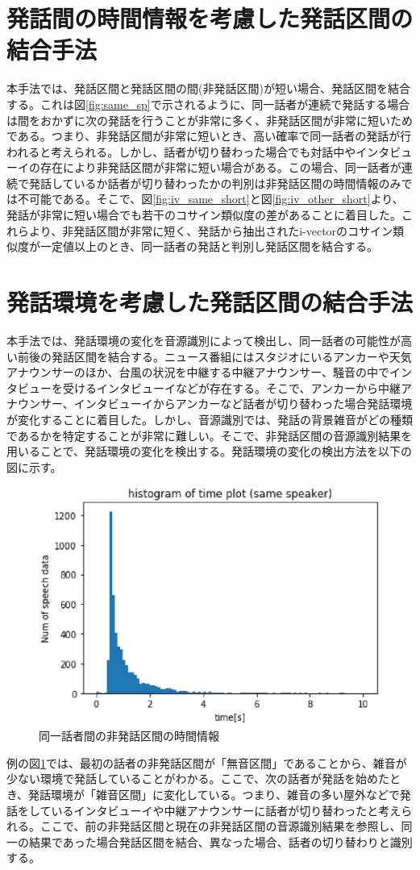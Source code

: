 \section{発話間の時間情報を考慮した発話区間の結合手法}
本手法では、発話区間と発話区間の間(非発話区間)が短い場合、発話区間を結合する。これは図\ref{fig:same_sp}で示されるように、同一話者が連続で発話する場合は間をおかずに次の発話を行うことが非常に多く、非発話区間が非常に短いためである。つまり、非発話区間が非常に短いとき、高い確率で同一話者の発話が行われると考えられる。しかし、話者が切り替わった場合でも対話中やインタビューイの存在により非発話区間が非常に短い場合がある。この場合、同一話者が連続で発話しているか話者が切り替わったかの判別は非発話区間の時間情報のみでは不可能である。そこで、図\ref{fig:iv_same_short}と図\ref{fig:iv_other_short}より、発話が非常に短い場合でも若干のコサイン類似度の差があることに着目した。これらより、非発話区間が非常に短く、発話から抽出されたi-vectorのコサイン類似度が一定値以上のとき、同一話者の発話と判別し発話区間を結合する。

\section{発話環境を考慮した発話区間の結合手法}
本手法では、発話環境の変化を音源識別によって検出し、同一話者の可能性が高い前後の発話区間を結合する。ニュース番組にはスタジオにいるアンカーや天気アナウンサーのほか、台風の状況を中継する中継アナウンサー、騒音の中でインタビューを受けるインタビューイなどが存在する。そこで、アンカーから中継アナウンサー、インタビューイからアンカーなど話者が切り替わった場合発話環境が変化することに着目した。しかし、音源識別では、発話の背景雑音がどの種類であるかを特定することが非常に難しい。そこで、非発話区間の音源識別結果を用いることで、発話環境の変化を検出する。発話環境の変化の検出方法を以下の図に示す。\par

\begin{figure}[H]
  \begin{center}
    \includegraphics{./figure/same_sp.eps}
  \end{center}
  \caption{同一話者間の非発話区間の時間情報 \label{fig:flow_prob2}}
\end{figure}

例の図\ref{fig:flow_prob2}では、最初の話者の非発話区間が「無音区間」であることから、雑音が少ない環境で発話していることがわかる。ここで、次の話者が発話を始めたとき、発話環境が「雑音区間」に変化している。つまり、雑音の多い屋外などで発話をしているインタビューイや中継アナウンサーに話者が切り替わったと考えられる。ここで、前の非発話区間と現在の非発話区間の音源識別結果を参照し、同一の結果であった場合発話区間を結合、異なった場合、話者の切り替わりと識別する。
